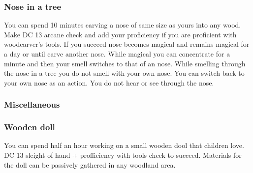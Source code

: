 \subsubsection{Nose in a tree}

You can spend 10 minutes carving a nose of same size as yours into any wood. Make DC 13 arcane check and add your proficiency if you are proficient with woodcarver's tools. If you succeed nose becomes magical and remains magical for a day or until carve another nose. While magical you can concentrate for a minute and then your smell switches to that of an nose. While smelling through the nose in a tree you do not smell with your own nose. You can switch back to your own nose as an action. You do not hear or see through the nose.

\subsubsection{Miscellaneous}

\subsubsection{Wooden doll}

You can spend half an hour working on a small wooden dool that children love. DC 13 sleight of hand + profficiency with tools check to succeed. Materials for the doll can be passively gathered in any woodland area.
